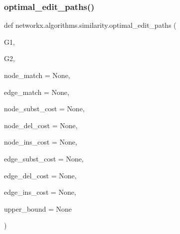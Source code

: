  \mbox{\label{namespacenetworkx_1_1algorithms_1_1similarity_a29f7692d60e03483f0160961805dc9fb}} 
\subsubsection{\texorpdfstring{optimal\+\_\+edit\+\_\+paths()}{optimal\_edit\_paths()}}
{\footnotesize\ttfamily def networkx.\+algorithms.\+similarity.\+optimal\+\_\+edit\+\_\+paths (\begin{DoxyParamCaption}\item[{}]{G1,  }\item[{}]{G2,  }\item[{}]{node\+\_\+match = {\ttfamily None},  }\item[{}]{edge\+\_\+match = {\ttfamily None},  }\item[{}]{node\+\_\+subst\+\_\+cost = {\ttfamily None},  }\item[{}]{node\+\_\+del\+\_\+cost = {\ttfamily None},  }\item[{}]{node\+\_\+ins\+\_\+cost = {\ttfamily None},  }\item[{}]{edge\+\_\+subst\+\_\+cost = {\ttfamily None},  }\item[{}]{edge\+\_\+del\+\_\+cost = {\ttfamily None},  }\item[{}]{edge\+\_\+ins\+\_\+cost = {\ttfamily None},  }\item[{}]{upper\+\_\+bound = {\ttfamily None} }\end{DoxyParamCaption})}

